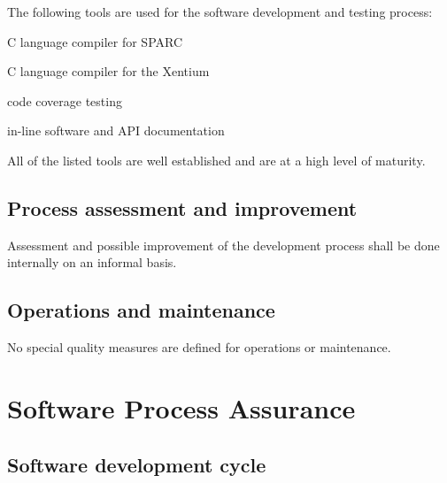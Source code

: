 \noindent
The following tools are used for the software development and testing process:

\begin{description}[labelwidth=4em,leftmargin=\parindent,labelindent=\parindent]
	\item[\textbf{sparc-gcc}]	C language compiler for \gls{SPARC}
	\item[\textbf{xentium-clang}]	C language compiler for the \gls{Xentium}
	\item[\textbf{gcov}]		code coverage testing
	\item[\textbf{doxygen}]		in-line software and \gls{API} documentation
\end{description}

\noindent
All of the listed tools are well established and are at a high level of maturity.


\section{Process assessment and improvement}

Assessment and possible improvement of the development process shall be done 
internally on an informal basis.


\section{Operations and maintenance}

No special quality measures are defined for operations or maintenance.



\chapter{Software Process Assurance}


\section{Software development cycle}



